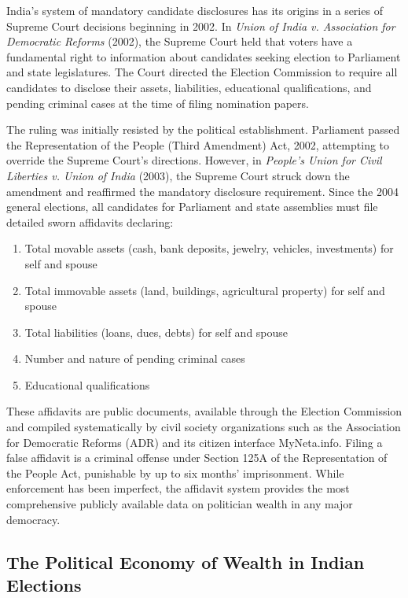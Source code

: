\documentclass[12pt]{article}
\begin{document}
India's system of mandatory candidate disclosures has its origins in a series of Supreme Court decisions beginning in 2002. In \textit{Union of India v. Association for Democratic Reforms} (2002), the Supreme Court held that voters have a fundamental right to information about candidates seeking election to Parliament and state legislatures. The Court directed the Election Commission to require all candidates to disclose their assets, liabilities, educational qualifications, and pending criminal cases at the time of filing nomination papers.

The ruling was initially resisted by the political establishment. Parliament passed the Representation of the People (Third Amendment) Act, 2002, attempting to override the Supreme Court's directions. However, in \textit{People's Union for Civil Liberties v. Union of India} (2003), the Supreme Court struck down the amendment and reaffirmed the mandatory disclosure requirement. Since the 2004 general elections, all candidates for Parliament and state assemblies must file detailed sworn affidavits declaring:

\begin{enumerate}
\item Total movable assets (cash, bank deposits, jewelry, vehicles, investments) for self and spouse
\item Total immovable assets (land, buildings, agricultural property) for self and spouse
\item Total liabilities (loans, dues, debts) for self and spouse
\item Number and nature of pending criminal cases
\item Educational qualifications
\end{enumerate}

These affidavits are public documents, available through the Election Commission and compiled systematically by civil society organizations such as the Association for Democratic Reforms (ADR) and its citizen interface MyNeta.info. Filing a false affidavit is a criminal offense under Section 125A of the Representation of the People Act, punishable by up to six months' imprisonment. While enforcement has been imperfect, the affidavit system provides the most comprehensive publicly available data on politician wealth in any major democracy.

\subsection{The Political Economy of Wealth in Indian Elections}
\end{document}
